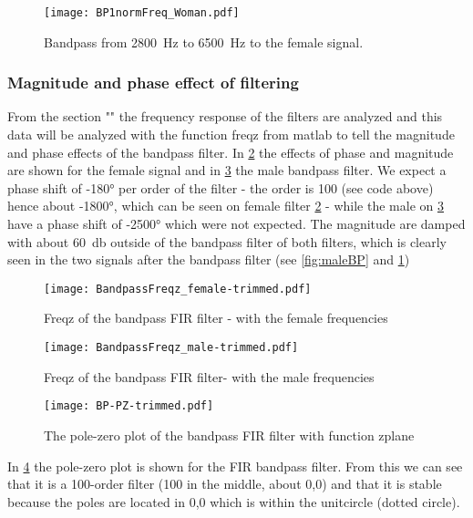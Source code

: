 \begin{figure}[h]
	\centering
	\texttt{[image: BP1normFreq\_Woman.pdf]}
	\caption{Bandpass from \SI{2800}{\hertz} to \SI{6500}{\hertz} to the female signal.}
	\label{fig:femaleBP}
\end{figure}


\subsubsection{Magnitude and phase effect of filtering}
From the section "" the frequency response of the filters are analyzed and this data will be analyzed with the function freqz from matlab to tell the magnitude and phase effects of the bandpass filter. In \cref{fig:freqzBP} the effects of phase and magnitude are shown for the female signal and in \cref{fig:freqzBPMale} the male bandpass filter. We expect a phase shift of \ang{-180} per order of the filter - the order is 100 (see code above) hence about \ang{-1800}, which can be seen on female filter \cref{fig:freqzBP} - while the male on \cref{fig:freqzBPMale} have a phase shift of \ang{-2500} which were not expected. The magnitude are damped with about \SI{60}{\decibel} outside of the bandpass filter of both filters, which is clearly seen in the two signals after the bandpass filter (see \cref{fig:maleBP} and \cref{fig:femaleBP})

\begin{figure}[h]
	\centering
	\texttt{[image: BandpassFreqz\_female-trimmed.pdf]}
	\caption{Freqz of the bandpass FIR filter - with the female frequencies}
	\label{fig:freqzBP}
\end{figure}

\begin{figure}[h]
	\centering
	\texttt{[image: BandpassFreqz\_male-trimmed.pdf]}
	\caption{Freqz of the bandpass FIR filter- with the male frequencies}
	\label{fig:freqzBPMale}
\end{figure}

\begin{figure}
	\centering
	\texttt{[image: BP-PZ-trimmed.pdf]}
	\caption{The pole-zero plot of the bandpass FIR filter with function zplane}
	\label{fig:BP-zplane}
\end{figure}

In \cref{fig:BP-zplane} the pole-zero plot is shown for the FIR bandpass filter. From this we can see that it is a 100-order filter (100 in the middle, about 0,0) and that it is stable because the poles are located in 0,0 which is within the unitcircle (dotted circle).  

